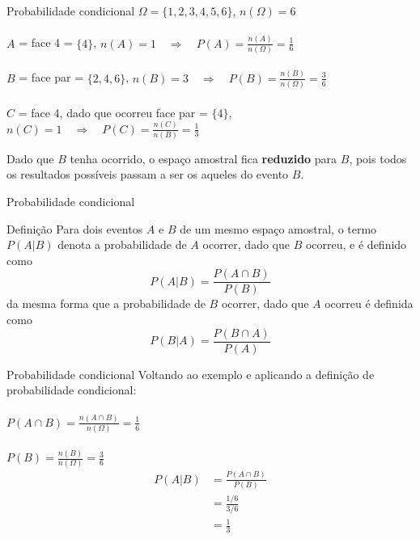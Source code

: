 \documentclass[10pt]{beamer}\usepackage[]{graphicx}\usepackage[]{color}
\theoremstyle{definition}
\begin{document}
\begin{frame}{Probabilidade condicional}
$\Omega = \{1,2,3,4,5,6\}$, $n(\Omega) = 6$ \\~\\
$A$ = face 4 = $\{4\}$, $n(A) = 1 \quad \Rightarrow \quad P(A) =
    \frac{n(A)}{n(\Omega)} = \frac{1}{6}$ \\~\\
$B$ = face par = $\{2,4,6\}$, $n(B) = 3 \quad \Rightarrow \quad
P(B) = \frac{n(B)}{n(\Omega)} = \frac{3}{6}$ \\~\\
$C$ = face 4, dado que ocorreu face par = $\{4\}$, $n(C) = 1
\quad \Rightarrow \quad P(C) = \frac{n(C)}{n(B)} = \frac{1}{3}$
\begin{alertblock}{}
  Dado que $B$ tenha ocorrido, o espaço amostral fica \textbf{reduzido}
  para $B$, pois todos os resultados possíveis passam a ser os aqueles
  do evento $B$.
\end{alertblock}
\end{frame}

\begin{frame}{Probabilidade condicional}
  \begin{block}{Definição}
    Para dois eventos $A$ e $B$ de um mesmo espaço amostral, o
    termo $P(A|B)$ denota a probabilidade de $A$ ocorrer, dado que $B$
    ocorreu, e é definido como
    \begin{equation*}
      P(A|B) = \frac{P(A \cap B)}{P(B)}
    \end{equation*}
    da mesma forma que a probabilidade de $B$ ocorrer, dado que $A$
    ocorreu é definida como
    \begin{equation*}
      P(B|A) = \frac{P(B \cap A)}{P(A)}
    \end{equation*}
  \end{block}
\end{frame}

\begin{frame}{Probabilidade condicional}
  Voltando ao exemplo e aplicando a definição de probabilidade
  condicional: \\~\\
  $P(A \cap B) = \frac{n(A \cap B)}{n(\Omega)} = \frac{1}{6}$ \\~\\
  $P(B) = \frac{n(B)}{n(\Omega)} = \frac{3}{6}$
  \vspace{1em}
  \begin{align*}
    P(A|B) &= \frac{P(A \cap B)}{P(B)} \\
     &= \frac{1/6}{3/6} \\
     &= \frac{1}{3}
  \end{align*}
\end{frame}
\end{document}
